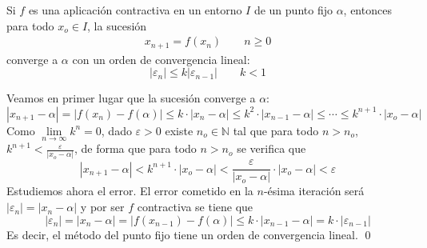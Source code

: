        \begin{met} Si $f$ es una aplicación contractiva en un entorno $I$ de un punto fijo $\alpha$, entonces para todo $x_o \in I$, la sucesión
       \begin{align}
           x_{n+1}=f(x_n) \qquad n \geq 0
           \label{met:punto}
        \end{align}
           converge a $\alpha$ con un orden de convergencia lineal:
           $$|\varepsilon_n|\leq k |\varepsilon_{n-1}| \qquad k<1$$
       \end{met}
       \begin{dem}
       Veamos en primer lugar que la sucesión converge a $\alpha$:
           $$|x_{n+1}- \alpha|=|f(x_{n})-f(\alpha)|\leq k \cdot |x_n - \alpha|\leq k^2 \cdot |x_{n-1}- \alpha| \leq \cdots \leq k^{n+1} \cdot |x_o - \alpha|$$
Como $\underset{n \to \infty}{\lim} k^n=0$, dado $\varepsilon>0$ existe $n_o \in \mathbb{N}$ tal que para todo $n > n_o$, $k^{n+1} < \frac{\varepsilon}{|x_o-\alpha|}$, de forma que para todo $n>n_o$ se verifica que
$$|x_{n+1}-\alpha|<k^{n+1}\cdot |x_o-\alpha|<\frac{\varepsilon}{|x_o-\alpha|}\cdot |x_o-\alpha| <\varepsilon$$
Estudiemos ahora el error. El error cometido en la $n$-ésima iteración será $|\varepsilon_n|=|x_n-\alpha|$ y por ser $f$ contractiva se tiene que
$$|\varepsilon_{n}|=|x_{n}-\alpha|=|f(x_{n-1})-f(\alpha)|\leq k \cdot |x_{n-1} - \alpha| = k \cdot |\varepsilon_{n-1}|$$
            Es decir, el método del punto fijo tiene un orden de convergencia lineal.
       \qed\end{dem} 

